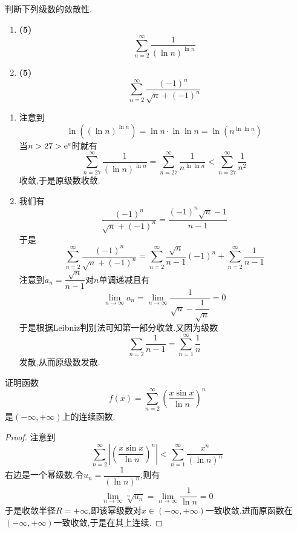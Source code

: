 \documentclass{ctexart}
\begin{document}
\begin{problem}[4.(10\songti{分})]
    判断下列级数的敛散性.
    \begin{enumerate}[label=\tbf{(\arabic*)},topsep=0pt,parsep=0pt,itemsep=0pt,partopsep=0pt]
        \item \textbf{(5)}
            \[\sum_{n=2}^{\infty}\dfrac{1}{(\ln n)^{\ln n}}\]
        \item \textbf{(5)}
            \[\sum_{n=2}^{\infty}\dfrac{(-1)^n}{\sqrt{n}+(-1)^n}\]

    \end{enumerate}
        
\end{problem}
\begin{solution}
    \begin{enumerate}[label=\tbf{(\arabic*)},topsep=0pt,parsep=0pt,itemsep=0pt,partopsep=0pt]
        \item 注意到
            \[\ln\left(\left(\ln n\right)^{\ln n}\right)=\ln n\cdot\ln\ln n=\ln\left(n^{\ln\ln n}\right)\]
            当$n>27>\mathrm{e}^{\mathrm{e}}$时就有
            \[\sum_{n=27}^{\infty}\dfrac{1}{\left(\ln n\right)^{\ln n}}=\sum_{n=27}^{\infty}\dfrac{1}{n^{\ln\ln n}}<\sum_{n=27}^{\infty}\dfrac{1}{n^2}\]
            收敛,于是原级数收敛.
        \item 我们有
            \[\dfrac{(-1)^n}{\sqrt{n}+(-1)^n}=\dfrac{(-1)^n\sqrt{n}-1}{n-1}\]
            于是
            \[\sum_{n=2}^{\infty}\dfrac{(-1)^n}{\sqrt{n}+(-1)^n}
            =\sum_{n=2}^{\infty}\dfrac{\sqrt{n}}{n-1}(-1)^{n}+\sum_{n=2}^{\infty}\dfrac{1}{n-1}\]
            注意到$a_n=\dfrac{\sqrt{n}}{n-1}$对$n$单调递减且有
            \[\lim_{n\to\infty}a_n=\lim_{n\to\infty}\dfrac{1}{\sqrt{n}-\dfrac{1}{\sqrt{n}}}=0\]
            于是根据Leibniz判别法可知第一部分收敛.又因为级数
            \[\sum_{n=2}\dfrac{1}{n-1}=\sum_{n=1}^{\infty}\dfrac1n\]
            发散,从而原级数发散.
    \end{enumerate}
\end{solution}
\begin{problem}[5.(15\songti{分})]
    证明函数
    \[f(x)=\sum_{n=2}^{\infty}\left(\dfrac{x\sin x}{\ln n}\right)^n\]
    是$(-\infty,+\infty)$上的连续函数.
\end{problem}
\begin{proof}
    注意到
    \[\sum_{n=2}^{\infty}\left|\left(\dfrac{x\sin x}{\ln n}\right)^{n}\right|<\sum_{n=1}^{\infty}\dfrac{x^n}{\left(\ln n\right)^n}\]
    右边是一个幂级数.令$u_n=\dfrac{1}{(\ln n)^n}$,则有
    \[\lim_{n\to\infty}\sqrt[n]{u_n}=\lim_{n\to\infty}\dfrac{1}{\ln n}=0\]
    于是收敛半径$R=+\infty$,即该幂级数对$x\in(-\infty,+\infty)$一致收敛.进而原函数在$(-\infty,+\infty)$一致收敛,于是在其上连续.
\end{proof}
\end{document}
